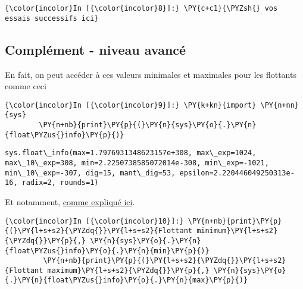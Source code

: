     \begin{Verbatim}[commandchars=\\\{\},frame=single,framerule=0.3mm,rulecolor=\color{cellframecolor}]
{\color{incolor}In [{\color{incolor}8}]:} \PY{c+c1}{\PYZsh{} vos essais successifs ici}
\end{Verbatim}


    \hypertarget{compluxe9ment---niveau-avancuxe9}{%
\subsection{Complément - niveau
avancé}\label{compluxe9ment---niveau-avancuxe9}}

    En fait, on peut accéder à ces valeurs minimales et maximales pour les
flottants comme ceci

    \begin{Verbatim}[commandchars=\\\{\},frame=single,framerule=0.3mm,rulecolor=\color{cellframecolor}]
{\color{incolor}In [{\color{incolor}9}]:} \PY{k+kn}{import} \PY{n+nn}{sys}
        \PY{n+nb}{print}\PY{p}{(}\PY{n}{sys}\PY{o}{.}\PY{n}{float\PYZus{}info}\PY{p}{)}
\end{Verbatim}


    \begin{Verbatim}[commandchars=\\\{\},frame=single,framerule=0.3mm,rulecolor=\color{cellframecolor}]
sys.float\_info(max=1.7976931348623157e+308, max\_exp=1024, max\_10\_exp=308, min=2.2250738585072014e-308, min\_exp=-1021, min\_10\_exp=-307, dig=15, mant\_dig=53, epsilon=2.220446049250313e-16, radix=2, rounds=1)
\end{Verbatim}

    Et notamment,
\href{https://docs.python.org/3/library/sys.html\#sys.float_info}{comme
expliqué ici}.

    \begin{Verbatim}[commandchars=\\\{\},frame=single,framerule=0.3mm,rulecolor=\color{cellframecolor}]
{\color{incolor}In [{\color{incolor}10}]:} \PY{n+nb}{print}\PY{p}{(}\PY{l+s+s2}{\PYZdq{}}\PY{l+s+s2}{Flottant minimum}\PY{l+s+s2}{\PYZdq{}}\PY{p}{,} \PY{n}{sys}\PY{o}{.}\PY{n}{float\PYZus{}info}\PY{o}{.}\PY{n}{min}\PY{p}{)}
         \PY{n+nb}{print}\PY{p}{(}\PY{l+s+s2}{\PYZdq{}}\PY{l+s+s2}{Flottant maximum}\PY{l+s+s2}{\PYZdq{}}\PY{p}{,} \PY{n}{sys}\PY{o}{.}\PY{n}{float\PYZus{}info}\PY{o}{.}\PY{n}{max}\PY{p}{)}
\end{Verbatim}


